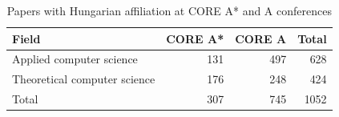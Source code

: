 \begin{table}[h]
  \centering
  \caption{Papers with Hungarian affiliation at CORE A* and A conferences}
  \label{tab:hungarian_core_summary}
  \begin{tabular}{l|rr|r}
    \toprule
    Field & CORE A* & CORE A & Total \\
    \midrule
    Applied computer science & 131 & 497 & 628 \\
    Theoretical computer science & 176 & 248 & 424 \\
    Total & 307 & 745 & 1052 \\
    \bottomrule
  \end{tabular}
\end{table}